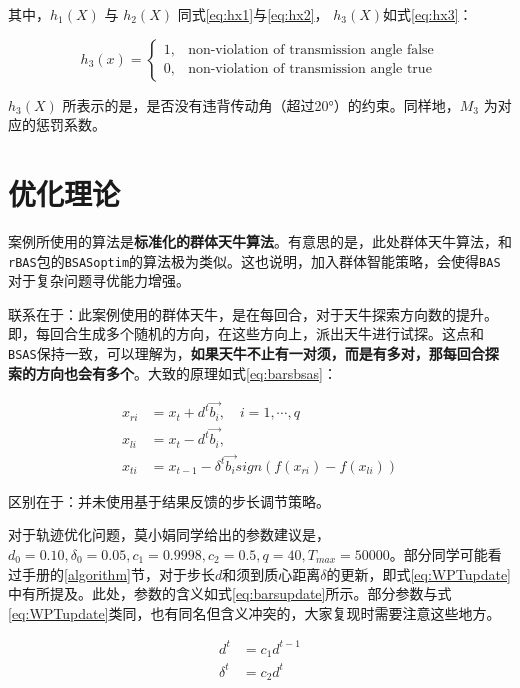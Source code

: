 \documentclass[]{ctexbook}
\begin{document}
其中，\(h_1(X)\) 与 \(h_2(X)\) 同式\eqref{eq:hx1}与\eqref{eq:hx2}，
\(h_3(X)\)如式\eqref{eq:hx3}：

\begin{equation}
h_3(x) = \begin{cases}
1, & \text{non-violation of transmission angle false}\\
0, & \text{non-violation of transmission angle true}
\end{cases}
\label{eq:hx3}
\end{equation}

\(h_3(X)\)
所表示的是，是否没有违背传动角（超过20°）的约束。同样地，\(M_3\)
为对应的惩罚系数。

\section{优化理论}

案例所使用的算法是\textbf{标准化的群体天牛算法}。有意思的是，此处群体天牛算法，和\texttt{rBAS}包的\texttt{BSASoptim}的算法极为类似。这也说明，加入群体智能策略，会使得\texttt{BAS}对于复杂问题寻优能力增强。

联系在于：此案例使用的群体天牛，是在每回合，对于天牛探索方向数的提升。即，每回合生成多个随机的方向，在这些方向上，派出天牛进行试探。这点和\texttt{BSAS}保持一致，可以理解为，\textbf{如果天牛不止有一对须，而是有多对，那每回合探索的方向也会有多个}。大致的原理如式\eqref{eq:barsbsas}：

\begin{equation}
\begin{split}
x_{ri} &= x_{t} + d^t\overrightarrow{b_i}, \quad i = 1,\cdots,q\\
x_{li} &= x_{t} - d^t\overrightarrow{b_i}, \\
x_{ti} &= x_{t-1} - \delta^t\overrightarrow{b_i}sign(f(x_{ri})-f(x_{li}))
\end{split}
\label{eq:barsbsas}
\end{equation}

区别在于：并未使用基于结果反馈的步长调节策略。

对于轨迹优化问题，莫小娟同学给出的参数建议是，\(d_0 = 0.10,\delta_0=0.05,c_1=0.9998,c_2=0.5,q=40,T_{max}=50000\)。部分同学可能看过手册的\ref{algorithm}节，对于步长\(d\)和须到质心距离\(\delta\)的更新，即式\eqref{eq:WPTupdate}中有所提及。此处，参数的含义如式\eqref{eq:barsupdate}所示。部分参数与式\eqref{eq:WPTupdate}类同，也有同名但含义冲突的，大家复现时需要注意这些地方。

\begin{equation}
\begin{split}
d^t &= c_1d^{t-1}\\
\delta^t&=c_2 d^t\\
\end{split}
\label{eq:barsupdate} 
\end{equation}
\end{document}

